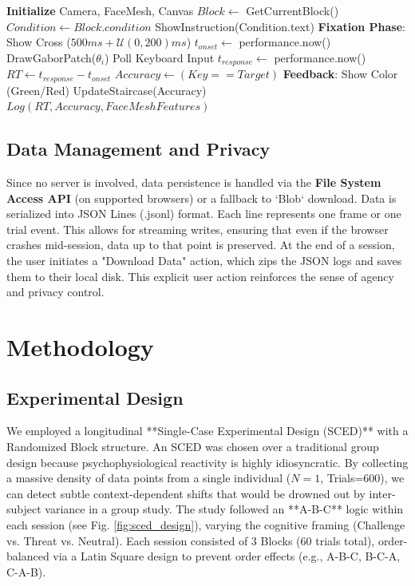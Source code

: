 \documentclass[journal]{IEEEtran}
\begin{document}
\begin{algorithm}
\caption{Camerala Task Loop (Simplified)}
\begin{algorithmic}
\STATE \textbf{Initialize} Camera, FaceMesh, Canvas
    \STATE $Block \leftarrow$ GetCurrentBlock()
    \STATE $Condition \leftarrow Block.condition$
    \STATE ShowInstruction(Condition.text)
        \STATE \textbf{Fixation Phase}: Show Cross ($500ms + \mathcal{U}(0, 200)ms$)
        \STATE $t_{onset} \leftarrow$ performance.now()
        \STATE DrawGaborPatch($\theta_i$)
            \STATE Poll Keyboard Input
        \ENDWHILE
        \STATE $t_{response} \leftarrow$ performance.now()
        \STATE $RT \leftarrow t_{response} - t_{onset}$
        \STATE $Accuracy \leftarrow (Key == Target)$
        \STATE \textbf{Feedback}: Show Color (Green/Red)
        \STATE UpdateStaircase(Accuracy)
        \STATE $Log(RT, Accuracy, FaceMeshFeatures)$
    \ENDFOR
\ENDWHILE
\end{algorithmic}
\end{algorithm}

\subsection{Data Management and Privacy}
Since no server is involved, data persistence is handled via the \textbf{File System Access API} (on supported browsers) or a fallback to `Blob` download.
Data is serialized into JSON Lines (.jsonl) format. Each line represents one frame or one trial event. This allows for streaming writes,
ensuring that even if the browser crashes mid-session, data up to that point is preserved.
At the end of a session, the user initiates a "Download Data" action, which zips the JSON logs and saves them to their local disk.
This explicit user action reinforces the sense of agency and privacy control.

\section{Methodology}

\subsection{Experimental Design}
We employed a longitudinal **Single-Case Experimental Design (SCED)** with a Randomized Block structure.
An SCED was chosen over a traditional group design because psychophysiological reactivity is highly idiosyncratic.
By collecting a massive density of data points from a single individual ($N=1$, Trials=600),
we can detect subtle context-dependent shifts that would be drowned out by inter-subject variance in a group study.
The study followed an **A-B-C** logic within each session (see Fig. \ref{fig:sced_design}), varying the cognitive framing (Challenge vs. Threat vs. Neutral).
Each session consisted of 3 Blocks (60 trials total), order-balanced via a Latin Square design to prevent order effects (e.g., A-B-C, B-C-A, C-A-B).
\end{document}
